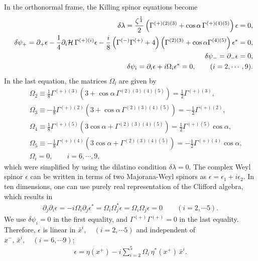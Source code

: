\documentclass[a4paper,12pt]{article}
\begin{document}
In the orthonormal frame, the Killing spinor equations become
\begin{eqnarray}\label{killing2}
&&\delta\lambda=\frac{\zeta^{\frac{1}{4}}}{2}\left(\Gamma^{(+)(2)(3)}+\cos{\alpha}\,\Gamma^{(+)(4)(5)}\right)\epsilon=0,\nonumber\\
&&\delta\psi_+=\partial_+\epsilon-\frac{1}{4}\partial_i{\cal H}\,\Gamma^{(+)(i)}\epsilon-\frac{i}{8}\left(\Gamma^{(-)}\Gamma^{(+)}+4\right)\left(\Gamma^{(2)(3)}+\cos{\alpha}\Gamma^{(4)(5)}\right)\epsilon^*=0,\nonumber\\
&&\delta\psi_-=\partial_-\epsilon=0,\nonumber\\
&&\delta\psi_i=\partial_i\epsilon+i\Omega_i\epsilon^*=0,\qquad (i=2,\cdots,9).
\end{eqnarray}
In the last equation, the matrices $\Omega_i$ are given by
\begin{eqnarray}
&&\Omega_2\equiv\frac{1}{8}\Gamma^{(+)(3)}\left(3+\cos{\alpha}\,\Gamma^{(2)(3)(4)(5)}\right)=\frac{1}{2}\Gamma^{(+)(3)},\nonumber\\
&&\Omega_3\equiv-\frac{1}{8}\Gamma^{(+)(2)}\left(3+\cos{\alpha}\,\Gamma^{(2)(3)(4)(5)}\right)=-\frac{1}{2}\Gamma^{(+)(2)},\nonumber\\
&&\Omega_4\equiv\frac{1}{8}\Gamma^{(+)(5)}\left(3\cos{\alpha}+\Gamma^{(2)(3)(4)(5)}\right)=\frac{1}{2}\Gamma^{(+)(5)}\cos{\alpha},\nonumber\\
&&\Omega_5\equiv-\frac{1}{8}\Gamma^{(+)(4)}\left(3\cos{\alpha}+\Gamma^{(2)(3)(4)(5)}\right)=-\frac{1}{2}\Gamma^{(+)(4)}\cos{\alpha}\nonumber,\\
&&\Omega_i=0,\qquad i=6,\cdots,9,
\end{eqnarray}
which were simplified by using the dilatino condition $\delta\lambda=0$.
The complex Weyl spinor $\epsilon$ can be written in terms of two Majorana-Weyl spinors as $\epsilon=\epsilon_1+i\epsilon_2$. In ten dimensions, one can use purely real representation of the Clifford algebra, which results in 
\begin{eqnarray}
\partial_j\partial_i\epsilon=-i\Omega_i\partial_j\epsilon^*=\Omega_i\Omega_j^*\epsilon=\Omega_i\Omega_j\epsilon=0 \qquad (i=2,\cdots 5).
\end{eqnarray}
We use $\delta\psi_i=0$ in the first equality, and  $\Gamma^{(+)}\Gamma^{(+)}=0$ in the last equality. Therefore, $\epsilon$ is linear in $\bar{x}^i,\quad (i=2,\cdots 5)$ and independent of $x^-,\,\bar{x}^i,\quad (i=6,\cdots 9)$;
\begin{eqnarray}\label{2bspinor}
\epsilon=\eta(x^+)-i\sum\limits_{i=2}^{5}\Omega_i\,\eta^*(x^+)\,\bar{x}^i.
\end{eqnarray}
\end{document}
